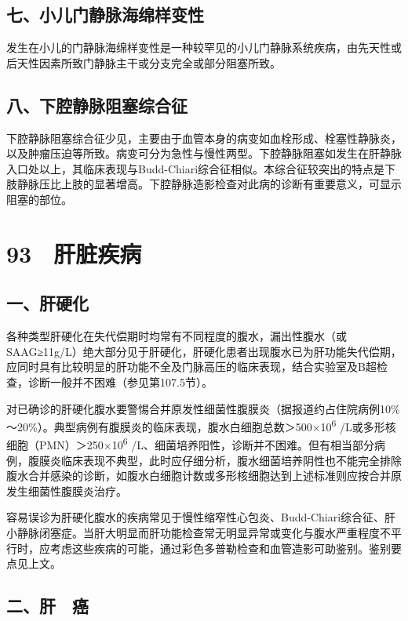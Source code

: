 \subsection{七、小儿门静脉海绵样变性}

发生在小儿的门静脉海绵样变性是一种较罕见的小儿门静脉系统疾病，由先天性或后天性因素所致门静脉主干或分支完全或部分阻塞所致。

\subsection{八、下腔静脉阻塞综合征}

下腔静脉阻塞综合征少见，主要由于血管本身的病变如血栓形成、栓塞性静脉炎，以及肿瘤压迫等所致。病变可分为急性与慢性两型。下腔静脉阻塞如发生在肝静脉入口处以上，其临床表现与Budd-Chiari综合征相似。本综合征较突出的特点是下肢静脉压比上肢的显著增高。下腔静脉造影检查对此病的诊断有重要意义，可显示阻塞的部位。

\protect\hypertarget{text00221.html}{}{}

\section{93　肝脏疾病}

\subsection{一、肝硬化}

各种类型肝硬化在失代偿期时均常有不同程度的腹水，漏出性腹水（或SAAG≥11g/L）绝大部分见于肝硬化，肝硬化患者出现腹水已为肝功能失代偿期，应同时具有比较明显的肝功能不全及门脉高压的临床表现，结合实验室及B超检查，诊断一般并不困难（参见第107.5节）。

对已确诊的肝硬化腹水要警惕合并原发性细菌性腹膜炎（据报道约占住院病例10\%～20\%）。典型病例有腹膜炎的临床表现，腹水白细胞总数＞500×10\textsuperscript{6}
/L或多形核细胞（PMN）＞250×10\textsuperscript{6}
/L、细菌培养阳性，诊断并不困难。但有相当部分病例，腹膜炎临床表现不典型，此时应仔细分析，腹水细菌培养阴性也不能完全排除腹水合并感染的诊断，如腹水白细胞计数或多形核细胞达到上述标准则应按合并原发生细菌性腹膜炎治疗。

容易误诊为肝硬化腹水的疾病常见于慢性缩窄性心包炎、Budd-Chiari综合征、肝小静脉闭塞症。当肝大明显而肝功能检查常无明显异常或变化与腹水严重程度不平行时，应考虑这些疾病的可能，通过彩色多普勒检查和血管造影可助鉴别。鉴别要点见上文。

\subsection{二、肝　癌}

